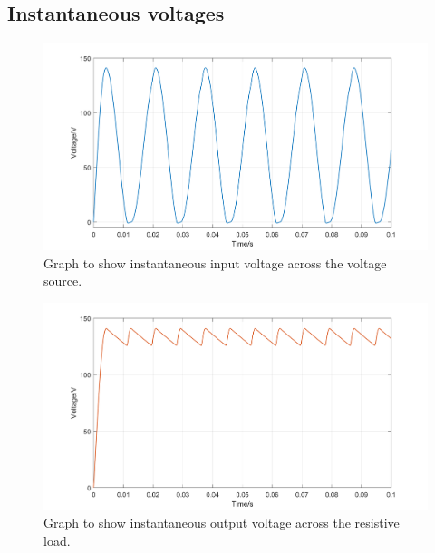 \subsection{Instantaneous voltages}
\begin{figure}[H]
    \centering
    \includegraphics[width = \textwidth]{img/figure2.png}
    \caption{Graph to show instantaneous input voltage across the voltage source.}
\end{figure}
\begin{figure}[H]
    \centering
    \includegraphics[width = \textwidth]{img/figure3.png}
    \caption{Graph to show instantaneous output voltage across the resistive load.}
    \label{fig:resistiveLoad}
\end{figure}
